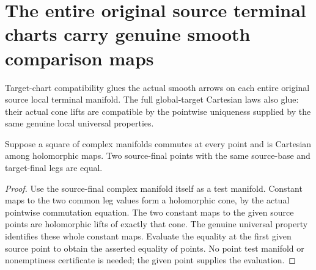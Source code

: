 \section{The entire original source terminal charts carry genuine smooth comparison maps}

Target-chart compatibility glues the actual smooth arrows on each entire
original source local terminal manifold. The full global-target Cartesian
laws also glue: their actual cone lifts are compatible by the pointwise
uniqueness supplied by the same genuine local universal properties.

\begin{lemma}
\label{hir:holomorphic-cartesian-square-joint-point-injectivity}
\leanok
Suppose a square of complex manifolds commutes at every point and is
Cartesian among holomorphic maps. Two source-final points with the same
source-base and target-final legs are equal.
\end{lemma}
\begin{proof}
Use the source-final complex manifold itself as a test manifold. Constant
maps to the two common leg values form a holomorphic cone, by the actual
pointwise commutation equation. The two constant maps to the given source
points are holomorphic lifts of exactly that cone. The genuine universal
property identifies these whole constant maps. Evaluate the equality at
the first given source point to obtain the asserted equality of points.
No point test manifold or nonemptiness certificate is needed; the given
point supplies the evaluation.
\end{proof}


